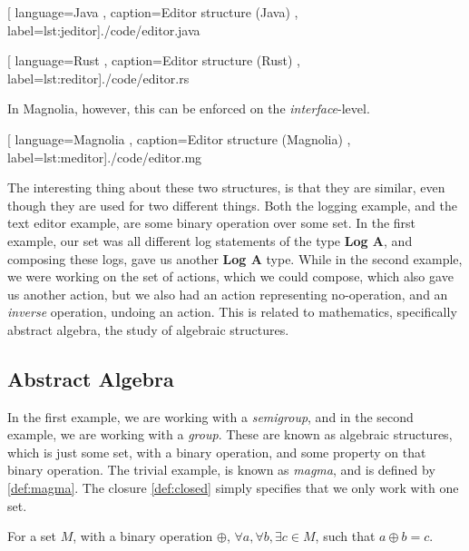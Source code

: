 
\begin{center}
  
    [ language=Java
    , caption={Editor structure (Java)}
    , label=lst:jeditor]{./code/editor.java}
\end{center}

\begin{center}
  
    [ language=Rust
    , caption={Editor structure (Rust)}
    , label=lst:reditor]{./code/editor.rs}
\end{center}

In Magnolia, however, this can be enforced on the \textit{interface}-level.

\begin{center}
  
    [ language=Magnolia
    , caption={Editor structure (Magnolia)}
    , label=lst:meditor]{./code/editor.mg}
\end{center}

The interesting thing about these two structures, is that they are similar,
even though they are used for two different things. Both the logging example,
and the text editor example, are some binary operation over some set. In the
first example, our set was all different log statements of the type
\textbf{Log A}, and composing these logs, gave us another \textbf{Log A} type.
While in the second example, we were working on the set of actions, which we
could compose, which also gave us another action, but we also had an action
representing no-operation, and an \textit{inverse} operation, undoing an action.
This is related to mathematics, specifically abstract algebra, the study of
algebraic structures.

\subsection{Abstract Algebra}

In the first example, we are working with a \textit{semigroup}, and in the
second example, we are working with a \textit{group}. These are known as
algebraic structures, which is just some set, with a binary operation, and some
property on that binary operation. The trivial example, is known as
\textit{magma}, and is defined by \ref{def:magma}. The closure \ref{def:closed}
simply specifies that we only work with one set.

\begin{definition}[Closure] \label{def:closed}
  For a set $M$, with a binary operation $\oplus$,
  $\forall a, \forall b, \exists c \in M$, such that
  $a \oplus b = c$.
\end{definition}

